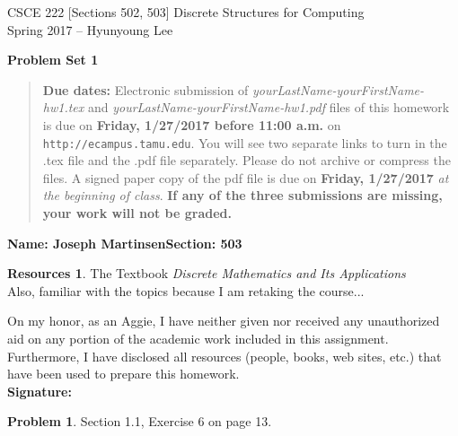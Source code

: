 \documentclass{article}
\theoremstyle{definition}
\newtheorem{problem}{Problem}
\newtheorem*{resources}{Resources}
\newcommand{\name}[2]{\noindent\textbf{Name: #1}\hfill \textbf{Section: #2}}
\newcommand{\honor}{\noindent On my honor, as an Aggie, I have neither
  given nor received any unauthorized aid on any portion of the
  academic work included in this assignment. Furthermore, I have
  disclosed all resources (people, books, web sites, etc.) that have
  been used to prepare this homework. \\[2ex]
 \textbf{Signature:} \underline{\hspace*{10cm}} }
\newcommand{\problemset}[1]{\begin{center}\textbf{Problem Set #1}\end{center}}
\newcommand{\duedate}[2]{\begin{quote}\textbf{Due dates:} Electronic
    submission of \textsl{yourLastName-yourFirstName-hw1.tex} and 
    \textsl{yourLastName-yourFirstName-hw1.pdf} files of this homework is due on
    \textbf{#1} on \texttt{http://ecampus.tamu.edu}. You will see two separate links
    to turn in the .tex file and the .pdf file separately. Please do not archive or compress the files.  
    A signed paper copy of the pdf file is due on \textbf{#2} \textsl{at the beginning of class}.
    \textbf{If any of the three submissions are missing, your work will not be graded.}\end{quote} }
\begin{document}
\vspace*{-15mm}
\begin{center}
{\large
CSCE 222 [Sections 502, 503] Discrete Structures for Computing\\[.5ex]
Spring 2017 -- Hyunyoung Lee\\}
\end{center}
\problemset{1}
\duedate{Friday, 1/27/2017 before 11:00 a.m.}{Friday, 1/27/2017}
\name{Joseph Martinsen}{503}
\begin{resources}
  The Textbook \textit{Discrete Mathematics and Its Applications} \\
  Also, familiar with the topics because I am retaking the course...
\end{resources}
\honor

\smallskip

\begin{problem} Section 1.1, Exercise 6 on page 13.
\end{problem}
\end{document}
